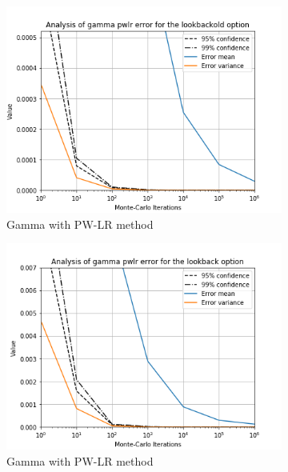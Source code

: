 \documentclass[11pt,a4paper,fleqn]{article}
\begin{document}
\begin{figure}[h!]
      \begin{subfigure}[b]{0.3\textwidth}
          \includegraphics[width=\textwidth]{graphs/lookbackoldgammapwlr.png}
          \caption{Gamma with PW-LR method}
      \end{subfigure}
      \begin{subfigure}[b]{0.3\textwidth}
          \includegraphics[width=\textwidth]{graphs/lookbackgammapwlr.png}
          \caption{Gamma with PW-LR method}
      \end{subfigure}
      \begin{subfigure}[b]{0.3\textwidth}

\end{subfigure}
\end{figure}
\end{document}
